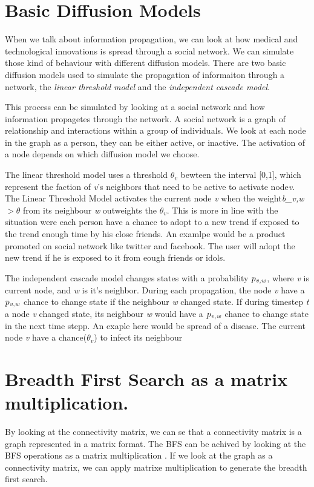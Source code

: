 \section{Basic Diffusion Models}
When we talk about information propagation, we can look at how medical and technological innovations is spread through a social network. We can simulate those kind of behaviour with different diffusion models. There are two basic diffusion models used to simulate the propagation of informaiton through a network\cite{kempe}, the {\it linear threshold model} and the {\it independent cascade model}\cite{kempe}.

This process can be simulated by looking at a social network and how information propagetes through the network. A social network is a graph of relationship and interactions within a group of individuals. 
We look at each node in the graph as a person, they can be either active, or inactive. The activation of a node depends on which diffusion model we choose.

The linear threshold model uses a threshold $\theta_v$ bewteen the interval [0,1], which represent the faction of {\it v}'s neighbors that need to be active to activate node{\it v}. The Linear Threshold Model activates the current node {\it v} when the weight{\it b_{v,w}} $> \theta$ from its neighbour {\it w} outweights the $\theta_v$. This is more in line with the situation were each person have a chance to adopt to a new trend if exposed to the trend enough time by his close friends. An examlpe would be a product promoted on social network like twitter and facebook. The user will adopt the new trend if he is exposed to it from eough friends or idols. 

The independent cascade model changes states with a probability $p_{\it v, w}$, where {\it v }is current node, and {\it w} is it's neighbor. During each propagation, the node {\it v} have a  $p_{\it v, w}$ chance to change state if the neighbour {\it w} changed state. If during timestep {\it t} a node {\it v} changed state, its neighbour {\it w} would have a  $p_{\it v, w}$ chance to change state in the next time stepp. An exaple here would be spread of a disease. The current node {\it v} have a chance($\theta_v$) to infect its neighbour

\section{Breadth First Search as a matrix multiplication.}
By looking at the 	connectivity matrix, we can se that a connectivity matrix is a graph represented in a matrix format. The BFS can be achived by looking at the BFS operations as a matrix multiplication \cite{algoToMath}. If we look at the graph as a connectivity matrix, we can apply matrixe multiplication to generate the breadth first search. 

